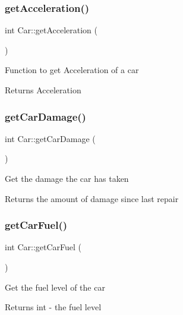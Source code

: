 \mbox{\label{class_car_a65f1e6a41427135fe69004642f485076}} 
\subsubsection{\texorpdfstring{get\+Acceleration()}{getAcceleration()}}
{\footnotesize\ttfamily int Car\+::get\+Acceleration (\begin{DoxyParamCaption}{ }\end{DoxyParamCaption})\hspace{0.3cm}{\ttfamily [inline]}}

Function to get Acceleration of a car \begin{DoxyReturn}{Returns}
Acceleration 
\end{DoxyReturn}
\mbox{\label{class_car_a949327d4945b878e9e34e92979b9e589}} 
\subsubsection{\texorpdfstring{get\+Car\+Damage()}{getCarDamage()}}
{\footnotesize\ttfamily int Car\+::get\+Car\+Damage (\begin{DoxyParamCaption}{ }\end{DoxyParamCaption})}

Get the damage the car has taken \begin{DoxyReturn}{Returns}
the amount of damage since last repair 
\end{DoxyReturn}
\mbox{\label{class_car_a7268dbaecbc6bca28bbe043d3a78a3fb}} 
\subsubsection{\texorpdfstring{get\+Car\+Fuel()}{getCarFuel()}}
{\footnotesize\ttfamily int Car\+::get\+Car\+Fuel (\begin{DoxyParamCaption}{ }\end{DoxyParamCaption})}

Get the fuel level of the car \begin{DoxyReturn}{Returns}
int -\/ the fuel level 
\end{DoxyReturn}
\mbox{\label{class_car_af47c8e6bb7bd54dc0f027b268916fc5c}} 
